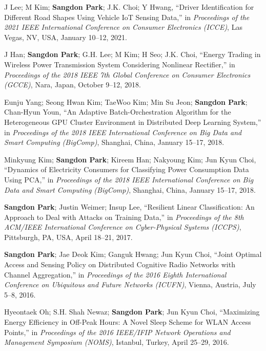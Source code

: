 \documentclass[11pt,a4paper]{article}
\begin{document}
\begin{enumerate}[label={[{\arabic*}]}, leftmargin=*, itemsep=0.3em]

\item J Lee; M Kim; \textbf{Sangdon Park}; J.K. Choi; Y Hwang, ``Driver Identification for Different Road Shapes Using Vehicle IoT Sensing Data,'' in \textit{Proceedings of the 2021 IEEE International Conference on Consumer Electronics (ICCE)}, Las Vegas, NV, USA, January 10--12, 2021.

\item J Han; \textbf{Sangdon Park}; G.H. Lee; M Kim; H Seo; J.K. Choi, ``Energy Trading in Wireless Power Transmission System Considering Nonlinear Rectifier,'' in \textit{Proceedings of the 2018 IEEE 7th Global Conference on Consumer Electronics (GCCE)}, Nara, Japan, October 9--12, 2018.

\item Eunju Yang; Seong Hwan Kim; TaeWoo Kim; Min Su Jeon; \textbf{Sangdon Park}; Chan-Hyun Youn, ``An Adaptive Batch-Orchestration Algorithm for the Heterogeneous GPU Cluster Environment in Distributed Deep Learning System,'' in \textit{Proceedings of the 2018 IEEE International Conference on Big Data and Smart Computing (BigComp)}, Shanghai, China, January 15--17, 2018.

\item Minkyung Kim; \textbf{Sangdon Park}; Kireem Han; Nakyoung Kim; Jun Kyun Choi, ``Dynamics of Electricity Consumers for Classifying Power Consumption Data Using PCA,'' in \textit{Proceedings of the 2018 IEEE International Conference on Big Data and Smart Computing (BigComp)}, Shanghai, China, January 15--17, 2018.

\item \textbf{Sangdon Park}; Justin Weimer; Insup Lee, ``Resilient Linear Classification: An Approach to Deal with Attacks on Training Data,'' in \textit{Proceedings of the 8th ACM/IEEE International Conference on Cyber-Physical Systems (ICCPS)}, Pittsburgh, PA, USA, April 18--21, 2017.

\item \textbf{Sangdon Park}; Jae Deok Kim; Ganguk Hwang; Jun Kyun Choi, ``Joint Optimal Access and Sensing Policy on Distributed Cognitive Radio Networks with Channel Aggregation,'' in \textit{Proceedings of the 2016 Eighth International Conference on Ubiquitous and Future Networks (ICUFN)}, Vienna, Austria, July 5--8, 2016.

\item Hyeontaek Oh; S.H. Shah Newaz; \textbf{Sangdon Park}; Jun Kyun Choi, ``Maximizing Energy Efficiency in Off-Peak Hours: A Novel Sleep Scheme for WLAN Access Points,'' in \textit{Proceedings of the 2016 IEEE/IFIP Network Operations and Management Symposium (NOMS)}, Istanbul, Turkey, April 25--29, 2016.


\end{enumerate}
\end{document}
